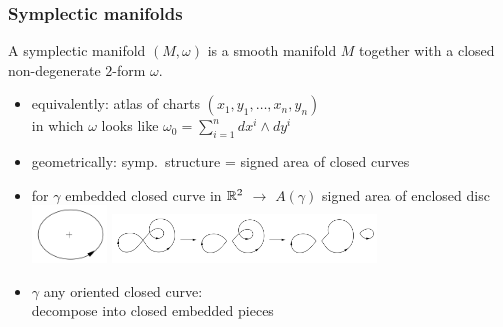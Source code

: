 \begin{frame}
  \frametitle{Symplectic manifolds}
  \begin{definition}
    A symplectic manifold $(M,\omega)$ is a smooth manifold $M$ together with a closed non-degenerate $2$-form $\omega$.
  \end{definition}
  \begin{itemize}
    \item equivalently: atlas of charts $(x_1,y_1,\dots,x_n,y_n)$\\
    in which $\omega$ looks like $\omega_0=\sum_{i=1}^n dx^i\wedge dy^i$
    \item geometrically: symp.\ structure = signed area of closed curves
    \item for $\gamma$ embedded closed curve in $\mathbb{R}^2$ $\to$ $A(\gamma)$ signed area of enclosed disc
    \includegraphics[width=2cm]{images/curve_orientation1.png}\pause
    \includegraphics[width=7cm]{images/splitting_nonembedded_curve.png}
    \item $\gamma$ any oriented closed  curve:\\ decompose into closed embedded pieces
  \end{itemize}
\end{frame}

